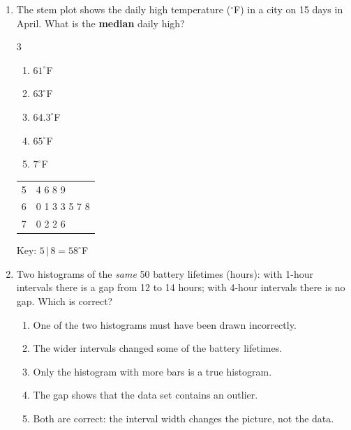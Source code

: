 \documentclass[12pt]{article}
\newenvironment{choices}
  {\begin{enumerate}[label=\textbf{(\Alph*)}, leftmargin=2.2em, itemsep=0pt, topsep=1pt]}
  {\end{enumerate}}
\newcommand{\letterroom}{\rule[-15pt]{0pt}{36pt}}
\begin{document}
\begin{enumerate}[leftmargin=1.9em, itemsep=0.03in]
  \boxguard[10]
  \item \begin{minipage}[t]{0.62\linewidth}\raggedright
        The stem plot shows the daily high temperature ($^\circ$F) in a city on 15 days in
        April. What is the \textbf{median} daily high?
        \begin{multicols}{3}
        \begin{choices}
          \item $61^\circ$F
          \item $63^\circ$F
          \item $64.3^\circ$F
          \item $65^\circ$F
          \item $7^\circ$F
        \end{choices}
        \end{multicols}
        \vspace{0.32in}
        \end{minipage}\hfill
        \begin{minipage}[t]{0.32\linewidth}
        \centering\small
        \begin{tabular}[t]{@{} r | l @{}}
        5 & 4 6 8 9 \\
        6 & 0 1 3 3 5 7 8 \\
        7 & 0 2 2 6 \\
        \end{tabular}\par\vspace{2pt}
        {\footnotesize Key: $5\,|\,8 = 58^\circ$F}
        \end{minipage}

  \boxguard[10]
  \item Two histograms of the \emph{same} 50 battery lifetimes (hours): with 1-hour intervals there
        is a gap from 12 to 14 hours; with 4-hour intervals there is no gap. Which is correct?
        \begin{choices}
          \item One of the two histograms must have been drawn incorrectly.
          \item The wider intervals changed some of the battery lifetimes.
          \item Only the histogram with more bars is a true histogram.
          \item The gap shows that the data set contains an outlier.
          \item Both are correct: the interval width changes the picture, not the data.
                \hfill{}\letterroom
        \end{choices}


\end{enumerate}
\end{document}
